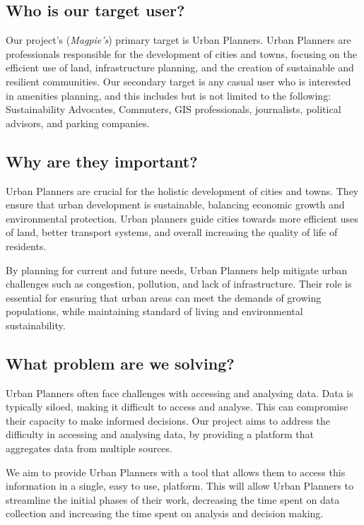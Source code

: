\subsection{Who is our target user?}
Our project's (\textit{Magpie's}) primary target is Urban Planners. Urban
Planners are professionals responsible for the development of cities and towns,
focusing on the efficient use of land, infrastructure planning, and the creation
of sustainable and resilient communities. Our secondary target is any casual
user who is interested in amenities planning, and this includes but is not
limited to the following: Sustainability Advocates, Commuters, GIS
professionals, journalists, political advisors, and parking companies.

\subsection{Why are they important?}
Urban Planners are crucial for the holistic development of cities and towns.
They ensure that urban development is sustainable, balancing economic growth and
environmental protection. Urban planners guide cities towards more efficient
uses of land, better transport systems, and overall increasing the quality of
life of residents.

\noindent{}By planning for current and future needs, Urban Planners help mitigate urban
challenges such as congestion, pollution, and lack of infrastructure. Their role
is essential for ensuring that urban areas can meet the demands of growing
populations, while maintaining standard of living and environmental
sustainability.

\subsection{What problem are we solving?}
Urban Planners often face challenges with accessing and analysing data. Data is
typically siloed, making it difficult to access and analyse. This can compromise
their capacity to make informed decisions. Our project aims to address the
difficulty in accessing and analysing data, by providing a platform that
aggregates data from multiple sources.

\noindent{}We aim to provide Urban Planners with a tool that allows them to access this
information in a single, easy to use, platform. This will allow Urban Planners
to streamline the initial phases of their work, decreasing the time spent on
data collection and increasing the time spent on analysis and decision making.

\newpage{}